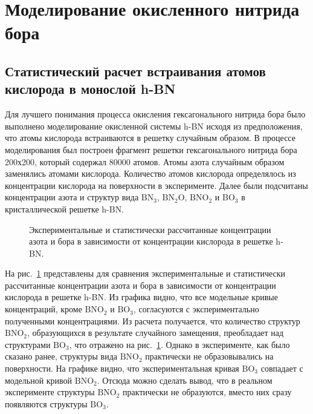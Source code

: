 \section{Моделирование окисленного нитрида бора}

\subsection{Статистический расчет встраивания атомов кислорода в монослой h-BN}

Для лучшего понимания процесса окисления гексагонального нитрида бора было выполнено моделирование окисленной системы 
h-BN исходя из предположения, что атомы кислорода встраиваются в решетку случайным образом. В процессе моделирования
был построен фрагмент решетки гексагонального нитрида бора 200х200, который содержал 80000 атомов. Атомы азота случайным образом 
заменялись атомами кислорода. Количество атомов кислорода определялось из концентрации кислорода на поверхности в эксперименте. 
Далее были подсчитаны концентрации азота и структур вида $\mathrm{BN_3}$, $\mathrm{BN_2O}$, $\mathrm{BNO_2}$ и $\mathrm{BO_3}$ в 
кристаллической решетке  h-BN.
	\begin{figure}[!ht]
		\caption{Экспериментальные и статистически рассчитанные концентрации азота и бора в зависимости от концентрации кислорода 
		в решетке h-BN.}
		\label{pic:BN_200x200_experiment_and_model}
		\end{figure}
На рис.~\ref{pic:BN_200x200_experiment_and_model} представлены для сравнения экспериментальные и статистически 
рассчитанные концентрации азота и бора в зависимости от концентрации кислорода в решетке h-BN. Из графика видно,
что все модельные кривые концентраций, кроме $\mathrm{BNO_2}$ и $\mathrm{BO_3}$, согласуются с экспериментально полученными 
концентрациями. Из расчета получается, что количество структур  $\mathrm{BNO_2}$, образующихся в результате случайного замещения,
преобладает над структурами $\mathrm{BO_3}$, что отражено на рис.~\ref{pic:BN_200x200_experiment_and_model}. Однако
в эксперименте, как было сказано ранее, структуры вида $\mathrm{BNO_2}$ практически не образовывались на поверхности.
На графике видно, что экспериментальная кривая $\mathrm{BO_3}$ совпадает с модельной кривой $\mathrm{BNO_2}$. Отсюда
можно сделать вывод, что в реальном эксперименте структуры $\mathrm{BNO_2}$ практически не образуются, вместо них
сразу появляются структуры $\mathrm{BO_3}$. 


